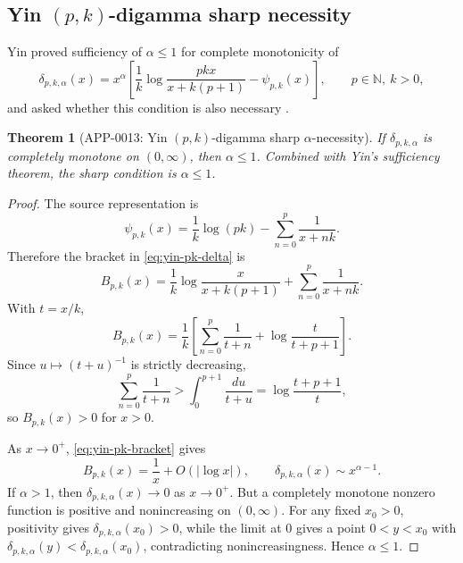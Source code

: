 \documentclass[11pt]{article}
\numberwithin{equation}{section}
\newtheorem{theorem}{Theorem}[section]
\theoremstyle{definition}
\theoremstyle{remark}
\newcommand{\1}{\mathbf 1}
\begin{document}
\subsection{Yin \((p,k)\)-digamma sharp necessity}

Yin proved sufficiency of \(\alpha\le1\) for complete monotonicity of
\begin{equation}
\label{eq:yin-pk-delta}
\delta_{p,k,\alpha}(x)
=x^\alpha\left[
\frac1k\log\frac{pkx}{x+k(p+1)}-\psi_{p,k}(x)
\right],
\qquad p\in\mathbb N,\ k>0,
\end{equation}
and asked whether this condition is also necessary \cite{yin-pk-digamma}.

\begin{theorem}[APP-0013: Yin \((p,k)\)-digamma sharp \(\alpha\)-necessity]
\label{thm:yin-pk-alpha-necessity}
If \(\delta_{p,k,\alpha}\) is completely monotone on \((0,\infty)\), then \(\alpha\le1\).  Combined with Yin's sufficiency theorem, the sharp condition is \(\alpha\le1\).
\end{theorem}

\begin{proof}
The source representation is
\begin{equation}
\label{eq:yin-pk-digamma-formula}
\psi_{p,k}(x)=\frac1k\log(pk)-\sum_{n=0}^p\frac1{x+nk}.
\end{equation}
Therefore the bracket in \eqref{eq:yin-pk-delta} is
\begin{equation}
\label{eq:yin-pk-bracket}
B_{p,k}(x)=
\frac1k\log\frac{x}{x+k(p+1)}
+\sum_{n=0}^p\frac1{x+nk}.
\end{equation}
With \(t=x/k\),
\[
B_{p,k}(x)=\frac1k\left[
\sum_{n=0}^p\frac1{t+n}
+\log\frac{t}{t+p+1}
\right].
\]
Since \(u\mapsto(t+u)^{-1}\) is strictly decreasing,
\[
\sum_{n=0}^p\frac1{t+n}
>
\int_0^{p+1}\frac{du}{t+u}
=\log\frac{t+p+1}{t},
\]
so \(B_{p,k}(x)>0\) for \(x>0\).

As \(x\to0^+\), \eqref{eq:yin-pk-bracket} gives
\begin{equation}
\label{eq:yin-pk-near-zero}
B_{p,k}(x)=\frac1x+O(|\log x|),
\qquad
\delta_{p,k,\alpha}(x)\sim x^{\alpha-1}.
\end{equation}
If \(\alpha>1\), then \(\delta_{p,k,\alpha}(x)\to0\) as \(x\to0^+\).  But a completely monotone nonzero function is positive and nonincreasing on \((0,\infty)\).  For any fixed \(x_0>0\), positivity gives \(\delta_{p,k,\alpha}(x_0)>0\), while the limit at \(0\) gives a point \(0<y<x_0\) with \(\delta_{p,k,\alpha}(y)<\delta_{p,k,\alpha}(x_0)\), contradicting nonincreasingness.  Hence \(\alpha\le1\).
\end{proof}
\end{document}

